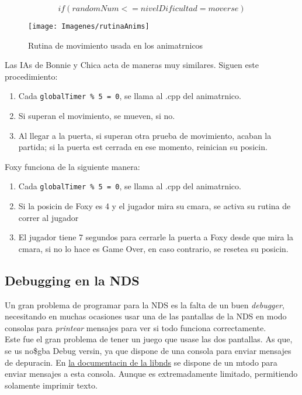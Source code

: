 \documentclass[12pt]{article}
\begin{document}
      $$if (randomNum <= nivelDificultad = moverse)$$
      \begin{figure}[H]
        \centering
        \texttt{[image: Imagenes/rutinaAnims]}
        \caption{Rutina de movimiento usada en los animatrnicos}
        \label{fig:rutinaanims}
      \end{figure}

      Las IAs de Bonnie y Chica acta de maneras muy similares. Siguen este procedimiento:
      \begin{enumerate}
        \item Cada \texttt{globalTimer \% 5 = 0}, se llama al .cpp del animatrnico.
        \item Si superan el movimiento, se mueven, si no.
        \item Al llegar a la puerta, si superan otra prueba de movimiento, acaban la partida; si la puerta est cerrada en ese momento, reinician su posicin.
      \end{enumerate}

      Foxy funciona de la siguiente manera:
      \begin{enumerate}
        \item Cada \texttt{globalTimer \% 5 = 0}, se llama al .cpp del animatrnico.
        \item Si la posicin de Foxy es 4 y el jugador mira su cmara, se activa su rutina de correr al jugador
        \item El jugador tiene 7 segundos para cerrarle la puerta a Foxy desde que mira la cmara, si no lo hace es Game Over, en caso contrario, se resetea su posicin.
      \end{enumerate}

  \subsection{Debugging en la NDS}
    Un gran problema de programar para la NDS es la falta de un buen \textit{debugger}, necesitando en muchas ocasiones usar una de las pantallas de la NDS en modo consolas para \textit{printear} mensajes para ver si todo funciona correctamente.\\

    Este fue el gran problema de tener un juego que usase las dos pantallas. As que, se us no\$gba Debug versin, ya que dispone de una consola para enviar mensajes de depuracin. En \href{https://libnds.devkitpro.org/debug_8h.html}{la documentacin de la libnds} se dispone de un mtodo para enviar mensajes a esta consola. Aunque es extremadamente limitado, permitiendo solamente imprimir texto.\\
\end{document}
